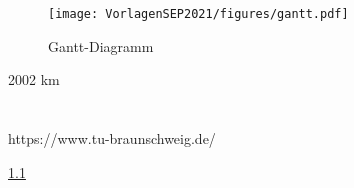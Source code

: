 \begin{figure}[ht]
\centering
\texttt{[image: VorlagenSEP2021/figures/gantt.pdf]}
\caption{Gantt-Diagramm}
\label{gantt}
\end{figure}

2002 km

\section{}
\subsection{}

https://www.tu-braunschweig.de/

\ref{}
